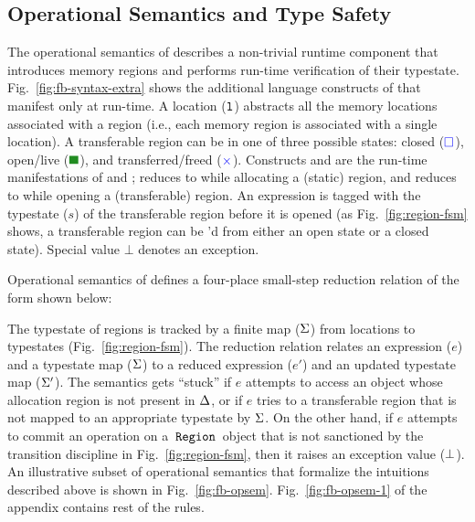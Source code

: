 \subsection{Operational Semantics and Type Safety}
\label{sec:fb-opsem}



The operational semantics of \FB describes a non-trivial runtime
component that introduces memory regions and performs run-time
verification of their typestate. Fig.~\ref{fig:fb-syntax-extra} shows the
additional language constructs of \FB that manifest only at run-time.
A location ($\mathtt{l}$) abstracts all the memory locations associated with
a region (i.e., each memory region is associated with a single
location). A transferable region can be in one of three possible
states: closed (${\color{blue} \square}$), open/live ($\LIVE$), and transferred/freed
(${\color{blue}\times}$). Constructs  and  are the run-time
manifestations of  and ;  reduces to
 while allocating a (static) region, and  reduces to
 while opening a (transferable) region. An 
expression is tagged with the typestate ($s$) of the transferable
region before it is opened (as Fig.~\ref{fig:region-fsm} shows, a
transferable region can be 'd from either an open state or a
closed state). Special value $\bot$ denotes an exception. 

Operational semantics of \FB defines a four-place small-step reduction
relation of the form shown below:
\begin{smathpar}
\end{smathpar}
The typestate of regions is tracked by a finite map ($\Sigma$) from
locations to typestates (Fig.~\ref{fig:region-fsm}). The reduction
relation relates an expression ($e$) and a typestate map ($\Sigma$) to a
reduced expression ($e'$) and an updated typestate map ($\Sigma'$). The
semantics gets ``stuck'' if $e$ attempts to access an object whose
allocation region is not present in $\Delta$, or if $e$ tries to
 a transferable region that is not mapped to an appropriate
typestate by $\Sigma$.  On the other hand, if $e$ attempts to commit an
operation on a $\,{\tt Region}\,$ object that is not sanctioned by the transition
discipline in Fig.~\ref{fig:region-fsm}, then it raises an exception
value ($\bot$). An illustrative subset of operational semantics
that formalize the intuitions described above is shown in
Fig.~\ref{fig:fb-opsem}.  Fig.~\ref{fig:fb-opsem-1} of the appendix
contains rest of the rules. 

